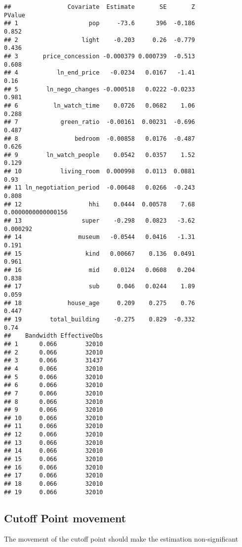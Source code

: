 \documentclass[
]{article}
\begin{document}
\begin{verbatim}
##                Covariate  Estimate       SE       Z             PValue
## 1                    pop     -73.6      396  -0.186              0.852
## 2                  light    -0.203     0.26  -0.779              0.436
## 3       price_concession -0.000379 0.000739  -0.513              0.608
## 4           ln_end_price   -0.0234   0.0167   -1.41               0.16
## 5        ln_nego_changes -0.000518   0.0222 -0.0233              0.981
## 6          ln_watch_time    0.0726   0.0682    1.06              0.288
## 7            green_ratio  -0.00161  0.00231  -0.696              0.487
## 8                bedroom  -0.00858   0.0176  -0.487              0.626
## 9        ln_watch_people    0.0542   0.0357    1.52              0.129
## 10           living_room  0.000998   0.0113  0.0881               0.93
## 11 ln_negotiation_period  -0.00648   0.0266  -0.243              0.808
## 12                   hhi    0.0444  0.00578    7.68 0.0000000000000156
## 13                 super    -0.298   0.0823   -3.62           0.000292
## 14                museum   -0.0544   0.0416   -1.31              0.191
## 15                  kind   0.00667    0.136  0.0491              0.961
## 16                   mid    0.0124   0.0608   0.204              0.838
## 17                   sub     0.046   0.0244    1.89              0.059
## 18             house_age     0.209    0.275    0.76              0.447
## 19        total_building    -0.275    0.829  -0.332               0.74
##    Bandwidth EffectiveObs
## 1      0.066        32010
## 2      0.066        32010
## 3      0.066        31437
## 4      0.066        32010
## 5      0.066        32010
## 6      0.066        32010
## 7      0.066        32010
## 8      0.066        32010
## 9      0.066        32010
## 10     0.066        32010
## 11     0.066        32010
## 12     0.066        32010
## 13     0.066        32010
## 14     0.066        32010
## 15     0.066        32010
## 16     0.066        32010
## 17     0.066        32010
## 18     0.066        32010
## 19     0.066        32010
\end{verbatim}

\hypertarget{cutoff-point-movement}{%
\subsection{Cutoff Point movement}\label{cutoff-point-movement}}

The movement of the cutoff point should make the estimation
non-significant
\end{document}
